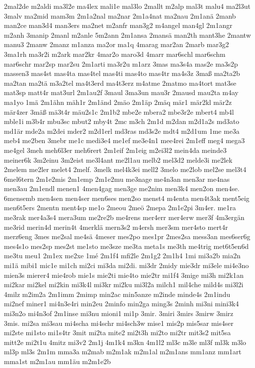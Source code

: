 {2mal2de
m2aldi
ma3l2e
ma4lex
mali1e
mal3lo
2mallt
m2alp
mal3t
malu4
ma2l3ut
3malv
ma2mid
mam3m
2m1a2nal
ma2nar
2m1a4nat
ma2nau
2m1anä
2manb
man2ce
man3d4
man3ers
ma2net
m2anfr
man3g2
m4angel
man4gl
2m1angr
m2anh
3manip
2manl
m2anle
5m2ann
2m1ansa
2mansä
man2th
mant3he
2mantw
manu3
2manw
2manz
m1anza
ma2or
ma1q
4marag
mar2an
2marb
mar3g2
3ma1rh
ma3r2i
m2ark
mar2kr
4mar2o
maro3d
4marr
mar6schl
mar6schm
mar6schr
mar2sp
mar2su
2m1arti
ma3r2u
m1arz
3mas
ma3s4a
mas2e
ma3s2p
massen3
mas4st
mas4ta
mas4tel
mas4ti
mas4to
mas4tr
ma4s3z
3maß
ma2ta2b
ma2tan
ma2tä
m3a2tel
ma4t3erd
ma4t3erz
m4atme
2matmo
ma4tort
mat3se
mat3sp
matt4r
mat3url
2m1au2f
3maul
3ma3un
mau3r
2mausd
mau2ta
m4ay
ma1yo
1mä
2m1ähn
mäh1r
2m1änd
2mäo
2m1äp
2mäq
mär1
mär2kl
mär2z
mär4zer
3mäß
mä3t4r
mäu2s1c
2m1b2
mbe2e
mbera2
mbe3r2e
mbert4
mb4l
mble1i
m3b4r
mbu3sc
mbut2
mby4t
2mc
m3ch
2m1d
m2dan
m2d1a2s
md3ato
md1är
mde2a
m2dei
mder2
m2d1erl
md3ras
md3s2e
mdt4
m2d1um
1me
me3a
meb4
me2ben
3mebr
me1c
medi3e4
me1ef
me3e4n1
mee4rei
2m1eff
meg4
mega3
me4gel
3meh
meh6l3er
meh6rert
2m1eif
2m1eig
m2ei3l2
mein4da
meinde3
meiner6k
3m2einu
3m2eist
me3l4ant
me2l1au
melb2
mel3d2
melde3i
me2lek
2melem
me2ler
melet4
2melf.
3melk
mel4k3ei
mell2
3melo
me2lob
mel2se
mel3t4
6mel6tern
2m1e2mis
2m1emp
2m1e2mu
me3nage
me4n3an
men3ar
me4nas
men3au
2m1endl
menen1
4men4gag
men3ge
me2nim
men3k4
men2on
men4se.
6mensemb
men4sen
men4ser
men6ses
men2so
menst4
m4enta
men4t3ak
ment5eig
men6t5ers
2mentn
ment4sp
me1o
2meou
2meö
2mepa
2m1e2pi
3m4er.
me1ra
me3rak
mer4a3s4
mera3um
me2re2b
me4rens
mer4err
mer4erw
mer3f
4m3ergän
me3rid
merin4d
merin4t
4merklä
mern3s2
m4ersh
mer3sm
mer4sto
mert4r
merz6eng
3mes
me2sal
me4sä
4meser
mes2po
mes1pr
2mes2sa
mess3an
mes6ser6g
mes4s1o
mes2sp
mes2st
me1sto
me3sze
me3ta
meta1s
me3th
me4trig
met6t5en6d
me3tu
meu1
2m1ex
me2xe
1mé
2m1f4
mfi2le
2m1g2
2m1h4
1mi
mi3a2b
mia2n
mi1ä
mibi1
mic1e
mi1ch
mi2ci
mi3da
mi2di.
mi3dr
2midy
mie3dr
mi3ele
mi4e3no
mien3s
mierer4
mie4rob
mie1s
mie2ti
mie4to
mie2tr
mi1f4
3mige
mi3h
mi2k1an
mi2kar
mi2kel
mi2kin
mi3k4l
mi3kr
mi2ku
mi3l2a
milch1
mil4che
mild4s
mi3l2i
4milz
m2im2a
2m1imm
2mimp
min2ac
min5anze
m2inde
minde4s
2m1indu
mi2nef
miner1
mi4n3e4ri
min2eu
2minfo
min2ga
ming3s
2minh
mi3ni
mini3k4
mi3n2o
mi4n3of
2m1inse
mi3nu
mioni1
mi1p
3mir.
3miri
3mirs
3mirw
3mirz
3mis.
mi2sa
mi3sau
mi4scha
mi4schr
mi4sch3w
mise1
mis2p
mis5sar
mis4ser
mi2ste
mi1sto
mi1s4tr
3mit
mi2ta
mite2
mi2t3h
mi2to
mi2tr
mit3s2
mit5sa
mitt2e
mi2t1u
4mitz
mi3v2
2m1j
4m1k4
m3kn
4m1l2
ml3c
m3le
ml3f
ml3k
m3lo
ml3p
ml3s
2m1m
mma3a
m2mab
m2m1ak
m2m1al
m2m1ans
mm1anz
mm1art
mma1st
m2m1au
mm1äu
m2m1e2b
}
